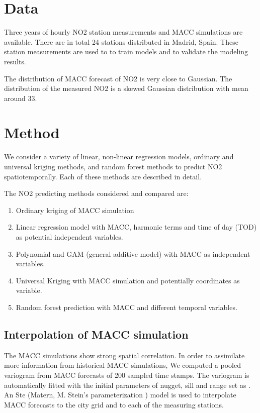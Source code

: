 \documentclass{article}
\begin{document}
 
 
\section{Data}

Three years of hourly NO2 station measurements and MACC simulations are available. There are in total 24 stations distributed in Madrid, Spain. These station measurements are used to to train models and to validate the modeling results.

The distribution of MACC forecast of NO2 is very close to Gaussian. The distribution of the measured NO2 is a skewed Gaussian distribution with mean around 33.


\section{Method}
We consider a variety of linear, non-linear regression models, ordinary and universal kriging methods, and random forest methods to predict NO2 spatiotemporally. Each of these methods are described in detail.  

The NO2 predicting methods considered and compared are:
\begin{enumerate}
    \item Ordinary kriging of MACC simulation
    \item Linear regression model with MACC, harmonic terms and time of day (TOD) as potential independent variables.
    \item Polynomial and GAM (general additive model) with MACC as independent variables. 
    \item Universal Kriging with MACC simulation and potentially coordinates as variable.
    \item Random forest prediction with MACC and different temporal variables. 
     
\end{enumerate}


\subsection{Interpolation of MACC simulation} 
The MACC simulations show strong spatial correlation. In order to assimilate more information from historical MACC simulations, We computed a pooled variogram from MACC forecasts of 200 sampled time stamps. The variogram is automatically fitted with the initial parameters of nugget, sill and range set as \citet{automap}. An Ste (Matern, M. Stein’s parameterization
) model is used to interpolate MACC forecasts to the city grid and to each of the measuring stations. 
\end{document}
